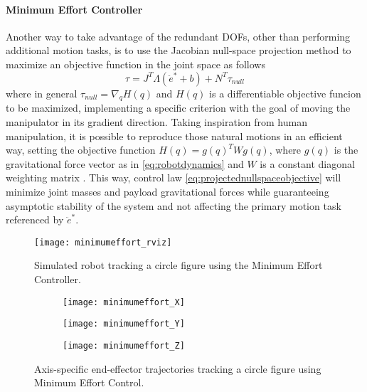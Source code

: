 \paragraph{Minimum Effort Controller}
Another way to take advantage of the redundant DOFs, other than performing additional motion tasks, is to use the Jacobian null-space projection method to maximize an objective function in the joint space as follows
\begin{equation}
\tau = J^T\Lambda(\ddot{e}^* + b) + N^T\tau_{null}
\label{eq:projectednullspaceobjective}
\end{equation}
where in general $\tau_{null} = \nabla_{q}H(q)$ and $H(q)$ is a differentiable objective funcion to be maximized, implementing a specific criterion with the goal of moving the manipulator in its gradient direction. Taking inspiration from human manipulation, it is possible to reproduce those natural motions in an efficient way, setting the objective function $H(q) = g(q)^{T}Wg(q)$, where $g(q)$ is the gravitational force vector as in \eqref{eq:robotdynamics} and $W$ is a constant diagonal weighting matrix \cite{ajoudani13}. This way, control law \eqref{eq:projectednullspaceobjective} will minimize joint masses and payload gravitational forces while guaranteeing asymptotic stability of the system and not affecting the primary motion task referenced by $\ddot{e}^*$.

\begin{figure}
\centering
\texttt{[image: minimumeffort\_rviz]}
\caption{Simulated robot tracking a circle figure using the Minimum Effort Controller.}
\end{figure}

\begin{figure}
	\centering
	\begin{subfigure}[t]{0.9\textwidth}
		\texttt{[image: minimumeffort\_X]}
	\end{subfigure}
	\begin{subfigure}[t]{0.9\textwidth}
		\texttt{[image: minimumeffort\_Y]}
	\end{subfigure}
	\begin{subfigure}[t]{0.9\textwidth}
		\texttt{[image: minimumeffort\_Z]}
	\end{subfigure}
	\caption{Axis-specific end-effector trajectories tracking a circle figure using Minimum Effort Control.}
\end{figure}

